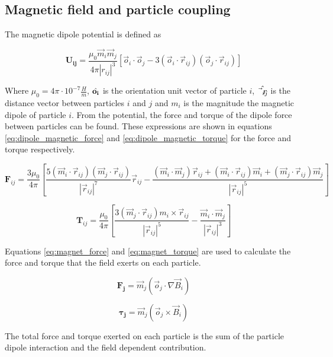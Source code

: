\subsection{Magnetic field and particle coupling}
\label{section:lbm_colloids_magnetics}

The magnetic dipole potential is defined as

\begin{equation}
    \mathbf{U_{ij}} = \frac{\mu_0 \vec{m}_i \vec{m}_j}{4\pi |r_{ij}|^{3}} \left[ \vec{o}_i \cdot \vec{o}_j - 
    3(\vec{o}_i \cdot \vec{r}_{ij})(\vec{o}_j \cdot \vec{r}_{ij}) \right]
    \label{eq:magnet_potential}
\end{equation}

Where $\mu_0 = 4\pi \cdot 10^{-7} \frac{H}{m}$,  $\Hat{\mathbf{o_i}}$ is the orientation unit vector of particle 
$i$, $\Hat{\vec{r}_{ij}}$ is the distance vector between particles $i$ and $j$ and $m_i$ is the magnitude the 
magnetic dipole of particle $i$. From the potential, the force and torque of the dipole force between particles 
can be found. These expressions are shown in equations \ref{eq:dipole_magnetic_force} and \ref{eq:dipole_magnetic_torque} 
for the force and torque respectively.

\begin{equation}
    \mathbf{F}_{ij} = \frac{3 \mu_0}{4 \pi} [\frac{5(\vec{m}_i \cdot \vec{r}_{ij} )(\vec{m}_j
    \cdot \vec{r}_{ij})}{|\vec{r}_{ij}|^7}\vec{r}_{ij} - \frac{(\vec{m}_{i} \cdot \vec{m}_{j})\vec{r}_{ij} + 
    (\vec{m}_{i} \cdot \vec{r}_{ij})\vec{m}_{i} + (\vec{m}_{j} \cdot \vec{r}_{ij})\vec{m}_{j} }{|\vec{r}_{ij}|^5}]
\label{eq:dipole_magnetic_force}
\end{equation}

\begin{equation}
    \mathbf{T}_{ij} = \frac{\mu_0}{4 \pi}[ \frac{3(\vec{m}_{j} \cdot \vec{r}_{ij})m_i \times \vec{r}_{ij} }
    {|\vec{r}_{ij}|^5} - \frac{\vec{m}_{i} \cdot \vec{m}_{j} }{|\vec{r}_{ij}|^3} ]
    \label{eq:dipole_magnetic_torque}
\end{equation}

Equations \ref{eq:magnet_force} and \ref{eq:magnet_torque} are used to calculate the force and torque that the 
field exerts on each particle.

\begin{equation}
    \mathbf{F_{j}} = \vec{m}_{j}(\vec{o}_{j} \cdot \nabla \vec{B}_{i})
    \label{eq:magnet_force}
\end{equation}

\begin{equation}
    \mathbf{\tau_j} = \vec{m}_{j}(\vec{o}_{j} \times \vec{B}_{i})
    \label{eq:magnet_torque}
\end{equation}

The total force and torque exerted on each particle is the sum of the particle dipole interaction and the field 
dependent contribution. 